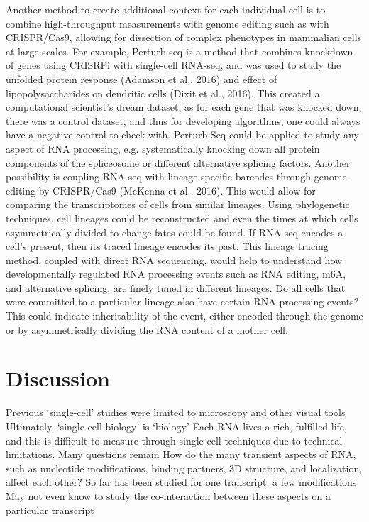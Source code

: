 Another method to create additional context for each individual cell is to combine high-throughput measurements with genome editing such as with CRISPR/Cas9, allowing for dissection of complex phenotypes in mammalian cells at large scales. For example, Perturb-seq is a method that combines knockdown of genes using CRISRPi with single-cell RNA-seq, and was used to study the unfolded protein response (Adamson et al., 2016) and effect of lipopolysaccharides on dendritic cells (Dixit et al., 2016). This created a computational scientist's dream dataset, as for each gene that was knocked down, there was a control dataset, and thus for developing algorithms, one could always have a negative control to check with. Perturb-Seq could be applied to study any aspect of RNA processing, e.g. systematically knocking down all protein components of the spliceosome or different alternative splicing factors.
Another possibility is coupling RNA-seq with lineage-specific barcodes through genome editing by CRISPR/Cas9 (McKenna et al., 2016). This would allow for comparing the transcriptomes of cells from similar lineages. Using phylogenetic techniques, cell lineages could be reconstructed and even the times at which cells asymmetrically divided to change fates could be found. If RNA-seq encodes a cell's present, then its traced lineage encodes its past. This lineage tracing method, coupled with direct RNA sequencing, would help to understand how developmentally regulated RNA processing events such as RNA editing, m6A, and alternative splicing, are finely tuned in different lineages. Do all cells that were committed to a particular lineage also have certain RNA processing events? This could indicate inheritability of the event, either encoded through the genome or by asymmetrically dividing the RNA content of a mother cell.


\section{Discussion}

Previous ‘single-cell' studies were limited to microscopy and other visual tools
Ultimately, ‘single-cell biology' is ‘biology'
Each RNA lives a rich, fulfilled life, and this is difficult to measure through single-cell techniques due to technical limitations.
Many questions remain
How do the many transient aspects of RNA, such as nucleotide modifications, binding partners, 3D structure, and localization, affect each other?
So far has been studied for one transcript, a few modifications
May not even know to study the co-interaction between these aspects on a particular transcript
